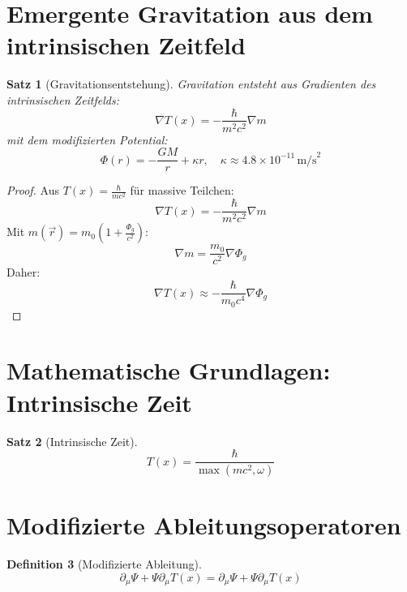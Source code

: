 \documentclass{article}
\newcommand{\Tfield}{T(x)}
\newcommand{\DcovT}[1]{\partial_\mu #1 + #1 \partial_\mu \Tfield}
\newtheorem{theorem}{Satz}[section]
\theoremstyle{definition}
\newtheorem{definition}[theorem]{Definition}
\theoremstyle{remark}
\begin{document}
	\section{Emergente Gravitation aus dem intrinsischen Zeitfeld}
	\begin{theorem}[Gravitationsentstehung]
		Gravitation entsteht aus Gradienten des intrinsischen Zeitfelds:
		\begin{equation}
			\nabla \Tfield = -\frac{\hbar}{m^2 c^2} \nabla m
		\end{equation}
		mit dem modifizierten Potential:
		\begin{equation}
			\Phi(r) = -\frac{GM}{r} + \kappa r, \quad \kappa \approx 4.8 \times 10^{-11} \, \text{m/s}^2
		\end{equation}
	\end{theorem}
	
	\begin{proof}
		Aus \( \Tfield = \frac{\hbar}{m c^2} \) für massive Teilchen:
		\begin{equation}
			\nabla \Tfield = -\frac{\hbar}{m^2 c^2} \nabla m
		\end{equation}
		Mit \( m(\vec{r}) = m_0 (1 + \frac{\Phi_g}{c^2}) \):
		\begin{equation}
			\nabla m = \frac{m_0}{c^2} \nabla \Phi_g
		\end{equation}
		Daher:
		\begin{equation}
			\nabla \Tfield \approx -\frac{\hbar}{m_0 c^4} \nabla \Phi_g
		\end{equation}
	\end{proof}
	
	\section{Mathematische Grundlagen: Intrinsische Zeit}
	\begin{theorem}[Intrinsische Zeit]
		\begin{equation}
			\Tfield = \frac{\hbar}{\max(m c^2, \omega)}
		\end{equation}
	\end{theorem}
	
	\section{Modifizierte Ableitungsoperatoren}
	\begin{definition}[Modifizierte Ableitung]
		\begin{equation}
			\DcovT{\Psi} = \partial_\mu \Psi + \Psi \partial_\mu \Tfield
		\end{equation}
	\end{definition}
	
\end{document}
